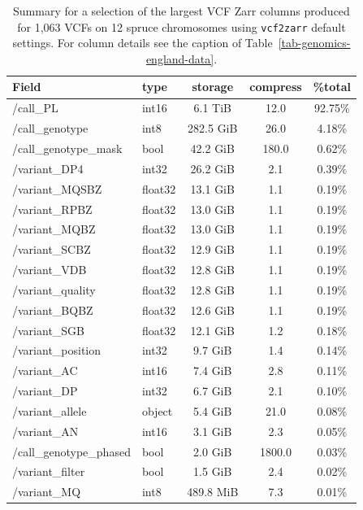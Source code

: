 \documentclass[a4paper,num-refs]{oup-contemporary}
\begin{document}
\begin{table}
\caption{Summary for a selection of the largest VCF Zarr columns produced for 
1,063 VCFs on 12 spruce chromosomes using \texttt{vcf2zarr}
default settings. For column details see the caption of Table~\ref{tab-genomics-england-data}.
\label{tab-spruce-data}}
\begin{tabular}{llS[table-format=3.1]S[table-format=3.2]S[table-format=3.2]}
\toprule
{Field} & {type} & {storage} & {compress} & {\%total} \\
  \midrule
  /call\_PL & int16 & 6.1 TiB & 12.0 & 92.75\% \\
  /call\_genotype & int8 & 282.5 GiB & 26.0 & 4.18\% \\
  /call\_genotype\_mask & bool & 42.2 GiB & 180.0 & 0.62\% \\
  /variant\_DP4 & int32 & 26.2 GiB & 2.1 & 0.39\% \\
  /variant\_MQSBZ & float32 & 13.1 GiB & 1.1 & 0.19\% \\
  /variant\_RPBZ & float32 & 13.0 GiB & 1.1 & 0.19\% \\
  /variant\_MQBZ & float32 & 13.0 GiB & 1.1 & 0.19\% \\
  /variant\_SCBZ & float32 & 12.9 GiB & 1.1 & 0.19\% \\
  /variant\_VDB & float32 & 12.8 GiB & 1.1 & 0.19\% \\
  /variant\_quality & float32 & 12.8 GiB & 1.1 & 0.19\% \\
  /variant\_BQBZ & float32 & 12.6 GiB & 1.1 & 0.19\% \\
  /variant\_SGB & float32 & 12.1 GiB & 1.2 & 0.18\% \\
  /variant\_position & int32 & 9.7 GiB & 1.4 & 0.14\% \\
  /variant\_AC & int16 & 7.4 GiB & 2.8 & 0.11\% \\
  /variant\_DP & int32 & 6.7 GiB & 2.1 & 0.10\% \\
  /variant\_allele & object & 5.4 GiB & 21.0 & 0.08\% \\
  /variant\_AN & int16 & 3.1 GiB & 2.3 & 0.05\% \\
  /call\_genotype\_phased & bool & 2.0 GiB & 1800.0 & 0.03\% \\
  /variant\_filter & bool & 1.5 GiB & 2.4 & 0.02\% \\
  /variant\_MQ & int8 & 489.8 MiB & 7.3 & 0.01\% \\
  \bottomrule
\end{tabular}
\end{table}
\end{document}

